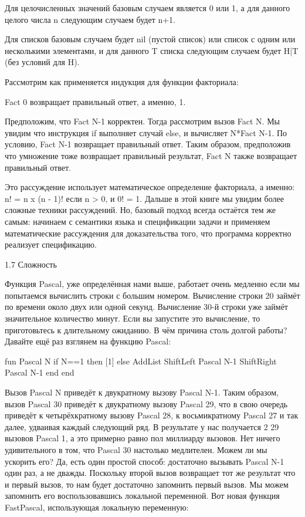 Для целочисленных значений базовым случаем является 0 или 1, а для данного целого числа n следующим случаем будет n+1.

Для списков базовым случаем будет nil (пустой список) или список с одним или несколькими элементами, и для данного T списка следующим случаем будет H|T (без условий для H).

Рассмотрим как применяется индукция для функции факториала:

{Fact 0} возвращает правильный ответ, а именно, 1.

Предположим, что {Fact N-1} корректен. Тогда рассмотрим вызов {Fact N}. Мы увидим что инструкция if выполняет случай else, и вычисляет N*{Fact N-1}. По условию, {Fact N-1} возвращает правильный ответ. Таким образом, предположив что умножение тоже возвращает правильный результат, {Fact N} также возвращает правильный ответ.

Это рассуждение использует математическое определение факториала, а именно: n! = n x (n - 1)! если n > 0, и 0! = 1. Дальше в этой книге мы увидим более сложные техники рассуждений. Но, базовый подход всегда остаётся тем же самым: начинаем с семантики языка и спецификации задачи и применяем математические рассуждения для доказательства того, что программа корректно реализует спецификацию.

1.7 Сложность

Функция Pascal, уже определённая нами выше, работает очень медленно если мы попытаемся вычислить строки с большим номером. Вычисление строки 20 займёт по времени около двух или одной секунд. Вычисление 30-й строки уже займёт значительное количество минут. Если вы запустите это вычисление, то приготовьтесь к длительному ожиданию. В чём причина столь долгой работы? Давайте ещё раз взглянем на функцию Pascal:

fun {Pascal N}
if N==1 then [1]
else
{AddList {ShiftLeft {Pascal N-1}}
{ShiftRight {Pascal N-1}}}
end
end

Вызов {Pascal N} приведёт к двукратному вызову {Pascal N-1}. Таким образом, вызов {Pascal 30} приведёт к двукратному вызову {Pascal 29}, что в свою очередь приведёт к четырёхкратному вызову {Pascal 28}, к восьмикратному {Pascal 27} и так далее, удваивая каждый следующий ряд. В результате у нас получается 2 29 вызовов {Pascal 1}, а это примерно равно пол миллиарду вызовов. Нет ничего удивительного в том, что {Pascal 30} настолько медлителен. Можем ли мы ускорить его? Да, есть один простой способ: достаточно вызывать {Pascal N-1} один раз, а не дважды. Поскольку второй вызов возвращает тот же результат что и первый вызов, то нам будет достаточно запомнить первый вызов. Мы можем запомнить его воспользовавшись локальной переменной. Вот новая функция FastPascal, использующая локальную переменную:

